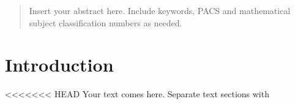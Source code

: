 \date{Received: date / Accepted: date}


\maketitle

\begin{abstract}
Insert your abstract here. Include keywords, PACS and mathematical
subject classification numbers as needed.
\end{abstract}

\section{Introduction}
\label{sec:1}
<<<<<<< HEAD
Your text comes here. Separate text sections with

